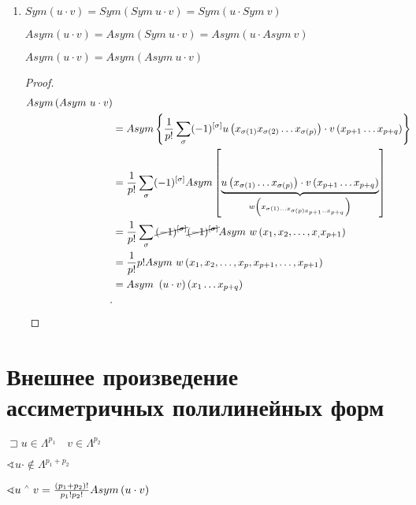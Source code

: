\documentclass{book}
\let\latexwedge\wedge
\def\wedge{\,\raisebox{0.5ex}{\ensuremath{\scriptscriptstyle\latexwedge}\,}}
\theoremstyle{definition}
\newtheorem*{note}{Замечание}
\begin{document}
\begin{enumerate}
\begin{note}
        $\hat e_y(y^k) = y^k(e_t)$
    \end{note}
\item $Sym\left( u\cdot v \right)  = Sym\left( Sym~u \cdot  v \right)  = Sym\left( u\cdot Sym~v \right) $ 

$Asym\left( u\cdot v \right)  = Asym\left( Sym~u \cdot  v \right)  = Asym\left( u\cdot Asym~v \right) $ 
\begin{statement}
    $Asym\left( u\cdot v \right)  = Asym\left( Asym~u\cdot v \right) $
\end{statement}
\begin{proof}
    \begin{align*}
        Asym\left( Asym~u\cdot v \right) \\
        &= Asym\left\{ \frac{1}{p!}\sum_{\sigma} (-1)^{\left[ \sigma \right] }u\left( x_{\sigma(1)}x_{\sigma(2)}\ldots x_{\sigma(p)} \right)  \cdot v\left( x_{p+1}\ldots x_{p+q} \right)\right\}   \\
        &= \frac{1}{p!}\sum_{\sigma}(-1)^{\left[ \sigma \right] }Asym\left[ \underbrace{u\left( x_{\sigma(1)}\ldots x_{\sigma(p)} \right) \cdot v\left( x_{p+1}\ldots x_{p+q} \right)}\limits_{w\left( x_{\sigma(1)\ldots x_{\sigma(p) x_{p+1} .. x_{p+q}}} \right) }  \right]  \\
        &= \frac{1}{p!} \sum_{\sigma}\cancel{(-1)^{\left[ \sigma \right] }} \cancel{(-1)^{\left[ \sigma \right] }}Asym~w\left( x_1, x_2, \ldots, x_, x_{p+1} \right) \\
        &= \frac{1}{p!}p!Asym~w\left( x_1, x_2, \ldots, x_{p}, x_{p+1}, \ldots, x_{p+1} \right)  \\
        &= Asym~\left( u\cdot v \right) \left( x_1 \ldots x_{p+q} \right)  \\
    .\end{align*}
\end{proof}

\end{enumerate}


\section{Внешнее произведение ассиметричных полилинейных форм}

$\sqsupset u\in \Lambda^{p_1}\quad v\in \Lambda^{p_2}$

$\sphericalangle u\cdot \not\in \Lambda^{p_1+p_2} $

$\sphericalangle u\wedge v = \frac{(p_1+p_2)!}{p_1!p_2!}Asym\left( u\cdot v \right) $
\end{document}
